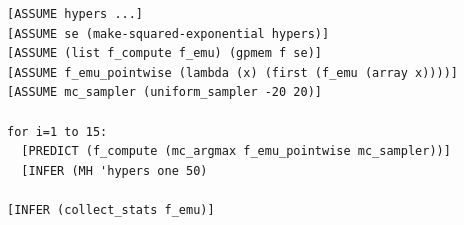 \documentclass{article} %
\newcommand{\argmax}[1]{\underset{#1}{\operatorname{arg}\,\operatorname{max}}\;}
\newcommand{\gpmem}{\texttt{gpmem}}
\begin{document}
\begin{lstlisting}[frame=single,caption={
  Code for Bayesian optimization using \gpmem.
  The procedure \texttt{f\_compute} computes \texttt{f} directly, thus improving the GP model \texttt{f\_emu}.
  (\texttt{f\_emu\_pointwise} is simply a shortcut for sampling the GP model at a single point; \texttt{f\_emu} is more general, allowing joint samples to be taken at any set of points.)
  In the loop, \texttt{f\_compute} is called to compute the value of \texttt{f} at a new argument.
  The new argument, \texttt{(mc\_argmax f\_emu\_pointwise mc\_sampler)}, is a Monte Carlo estimate of the maximum pointwise sample of \texttt{f\_emu} (itself a stochastic quantity), with the Monte Carlo samples being drawn in this case uniformly between $-20$ and $20$.
  After each new call to \texttt{f\_compute}, the Metropolis--Hastings algorithm is used to perform inference on the hyperparameters of the covariance function in the GP model in light of the new conditioning data.
  Once enough calls to \texttt{f\_compute} have been made (in our case we stopped at 15 calls), we can inspect the full list of probed $(x,y)$ pairs with \texttt{extract\_stats}.
  The answer to our maximization problem is simply the maximum $y$; but our algorithm also learns more potentially useful information.
},mathescape,label=alg:bayesopt]
[ASSUME hypers ...]
[ASSUME se (make-squared-exponential hypers)]
[ASSUME (list f_compute f_emu) (gpmem f se)]
[ASSUME f_emu_pointwise (lambda (x) (first (f_emu (array x))))]
[ASSUME mc_sampler (uniform_sampler -20 20)]

for i=1 to 15:
  [PREDICT (f_compute (mc_argmax f_emu_pointwise mc_sampler))]
  [INFER (MH 'hypers one 50)

[INFER (collect_stats f_emu)]
\end{lstlisting}
\end{document}
